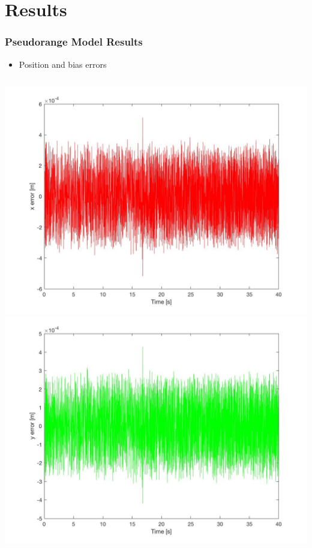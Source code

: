 \documentclass{beamer}
\begin{document}
    
\section{Results}
    



	\begin{frame}
		\frametitle{Pseudorange Model Results}
		\begin{itemize}
		       \item Position and bias errors
		\end{itemize}
		\begin{columns}
			\includegraphics[scale=0.1]{x_error.jpg}\\
			\includegraphics[scale=0.1]{y_error.jpg}

\end{columns}
\end{frame}
\end{document}
